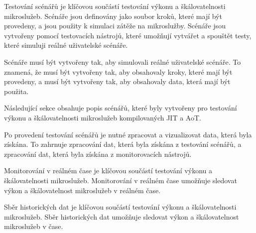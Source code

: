




Testování scénářů je klíčovou součástí testování výkonu a škálovatelnosti mikroslužeb. Scénáře jsou definovány jako soubor kroků, které mají být provedeny, a jsou použity k simulaci zátěže na mikroslužby. Scénáře jsou vytvořeny pomocí testovacích nástrojů, které umožňují vytvářet a spouštět testy, které simuluji reálné uživatelské scénáře.


Scénáře musí být vytvořeny tak, aby simulovali reálné uživatelské scénáře. To znamená, že musí být vytvořeny tak, aby obsahovaly kroky, které mají být provedeny, a musí být vytvořeny tak, aby obsahovaly data, která mají být použita.


Následující sekce obsahuje popis scénářů, které byly vytvořeny pro testování výkonu a škálovatelnosti mikroslužeb kompilovaných JIT a AoT.




Po provedení testování scénářů je nutné zpracovat a vizualizovat data, která byla získána. To zahrnuje zpracování dat, která byla získána z testování scénářů, a zpracování dat, která byla získána z monitorovacích nástrojů.


Monitorování v reálném čase je klíčovou součástí testování výkonu a škálovatelnosti mikroslužeb. Monitorování v reálném čase umožňuje sledovat výkon a škálovatelnost mikroslužeb v reálném čase.


Sběr historických dat je klíčovou součástí testování výkonu a škálovatelnosti mikroslužeb. Sběr historických dat umožňuje sledovat výkon a škálovatelnost mikroslužeb v čase.


